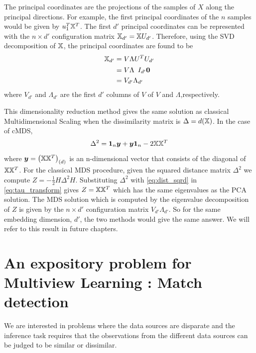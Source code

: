 \documentclass[12pt,oneside,final]{thesis}\usepackage[]{graphicx}\usepackage[]{color}
\begin{document}
The principal coordinates are the projections of the samples of $X$ along the principal directions. For example, the first principal coordinates of the $n$ samples would be given by $u_1^T {\mathbb{X}}^T$. The  first $d'$ principal coordinates can be represented with the $n \times d'$ configuration matrix $\mathbb{X}_{d'} =  {\mathbb{X}}  U_{d'}$. Therefore, using the SVD decomposition of $\mathbb{X}$,  the principal coordinates are found to be  
\begin{align}
\mathbb{X}_{d'}&= V \Lambda U^T U_{d'} \\
       &= V  \Lambda \begin{array}{c}
I_{d'}
\bm{0}
\end{array} \\
&= V_{d'} \Lambda_{d'} 
\end{align}
where   $V_{d'}$ and $\Lambda_{d'}$  are the first $d'$ columns of $V$  of   $V$ and $\Lambda$,respectively.


This dimensionality reduction method gives the same solution as classical Multidimensional Scaling when the dissimilarity matrix is $\Delta =d(\mathbb{X})$. In the case of cMDS, $$\Delta^2=  \mbox{{\bf 1}}_n \bm{y} +\bm{y} \mbox{{\bf 1}}_n -2 \mathbb{X} \mathbb{X}^T \label{eq:dist_sqrd}$$ where $\bm{y}= \left(\mathbb{X}\mathbb{X}^T \right)_{(d)}$ is an n-dimensional vector that consists of  the diagonal of $\mathbb{X}\mathbb{X}^T$.
For the classical MDS procedure, given the squared distance matrix $\Delta^2$ we compute $Z=  - \frac{1}{2} H\Delta^2 H \label{eq:tau_transform}$. Substituting $\Delta^2$ with \eqref{eq:dist_sqrd}   in \eqref{eq:tau_transform} gives $ Z= \mathbb{X}\mathbb{X}^T$ which has the same eigenvalues as the PCA solution. The MDS solution which is computed by the eigenvalue decomposition of $Z$ is given by the $n \times d'$ configuration matrix  $V_{d'} \Lambda_{d'}$. So for the same embedding dimension, $d'$, the two methods would give the same answer. We will refer to this result in future chapters.





\chapter{An expository problem for Multiview Learning : Match detection}
\label{chap:match_detection}

 We are interested in problems where the data sources are disparate and the inference task requires that the observations from  the different data sources  can be judged to be similar or dissimilar.
  
\end{document}
